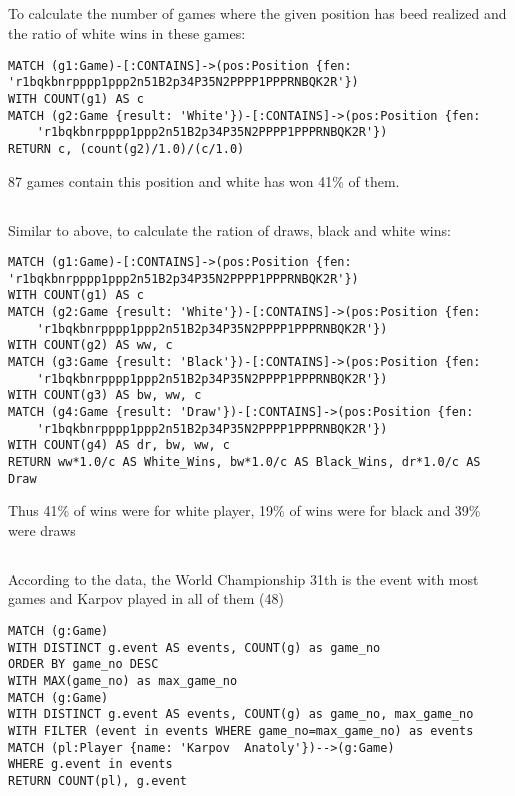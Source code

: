 \documentclass{article}
\begin{document}
\subsection{}
To calculate the number of games where the given position has beed realized and
the ratio of white wins in these games:
\begin{lstlisting}
MATCH (g1:Game)-[:CONTAINS]->(pos:Position {fen: 'r1bqkbnrpppp1ppp2n51B2p34P35N2PPPP1PPPRNBQK2R'})
WITH COUNT(g1) AS c
MATCH (g2:Game {result: 'White'})-[:CONTAINS]->(pos:Position {fen: 
	'r1bqkbnrpppp1ppp2n51B2p34P35N2PPPP1PPPRNBQK2R'})
RETURN c, (count(g2)/1.0)/(c/1.0)
\end{lstlisting}
87 games contain this position and white has won 41\% of them.

\subsection{}
Similar to above, to calculate the ration of draws, black and white wins:
\begin{lstlisting}
MATCH (g1:Game)-[:CONTAINS]->(pos:Position {fen: 'r1bqkbnrpppp1ppp2n51B2p34P35N2PPPP1PPPRNBQK2R'})
WITH COUNT(g1) AS c
MATCH (g2:Game {result: 'White'})-[:CONTAINS]->(pos:Position {fen: 
	'r1bqkbnrpppp1ppp2n51B2p34P35N2PPPP1PPPRNBQK2R'})
WITH COUNT(g2) AS ww, c
MATCH (g3:Game {result: 'Black'})-[:CONTAINS]->(pos:Position {fen: 
	'r1bqkbnrpppp1ppp2n51B2p34P35N2PPPP1PPPRNBQK2R'})
WITH COUNT(g3) AS bw, ww, c
MATCH (g4:Game {result: 'Draw'})-[:CONTAINS]->(pos:Position {fen: 
	'r1bqkbnrpppp1ppp2n51B2p34P35N2PPPP1PPPRNBQK2R'})
WITH COUNT(g4) AS dr, bw, ww, c
RETURN ww*1.0/c AS White_Wins, bw*1.0/c AS Black_Wins, dr*1.0/c AS Draw
\end{lstlisting}
Thus 41\% of wins were for white player, 19\% of wins were for black and 39\%
were draws

\subsection{}
According to the data, the World Championship 31th is the event with most games
and Karpov played in all of them (48)
\begin{lstlisting}
MATCH (g:Game)
WITH DISTINCT g.event AS events, COUNT(g) as game_no
ORDER BY game_no DESC
WITH MAX(game_no) as max_game_no
MATCH (g:Game)
WITH DISTINCT g.event AS events, COUNT(g) as game_no, max_game_no
WITH FILTER (event in events WHERE game_no=max_game_no) as events
MATCH (pl:Player {name: 'Karpov  Anatoly'})-->(g:Game)
WHERE g.event in events
RETURN COUNT(pl), g.event
\end{lstlisting}
\end{document}
